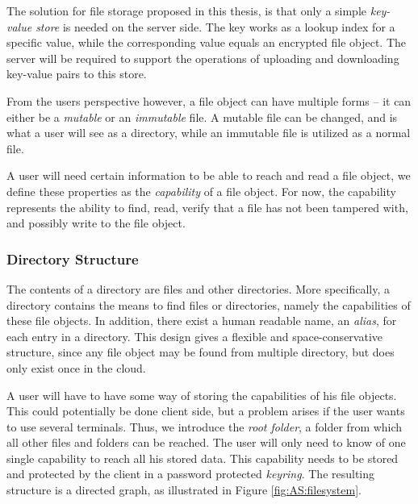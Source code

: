 \documentclass[pdftex,english,10pt,b5paper,twoside]{book}
\begin{document}
The solution for file storage proposed in this thesis, is that only a simple
\emph{key-value store} is needed on the server side. The key works as a lookup
index for a specific value, while the corresponding value equals an encrypted
file object. The server will be required to support the operations of uploading
and downloading key-value pairs to this store.

From the users perspective however, a file object can have multiple forms -- it
can either be a \emph{mutable} or an \emph{immutable} file. A mutable file can
be changed, and is what a user will see as a directory, while an immutable file
is utilized as a normal file.

A user will need certain information to be able to reach and read a file
object, we define these properties as the \emph{capability} of a file object.
For now, the capability represents the ability to find, read, verify that a
file has not been tampered with, and possibly write to the file object.

\subsubsection{Directory Structure}

The contents of a directory are files and other directories. More specifically,
a directory contains the means to find files or directories, namely the
capabilities of these file objects. In addition, there exist a human readable
name, an \emph{alias}, for each entry in a directory. This design gives a
flexible and space-conservative structure, since any file object may be found
from multiple directory, but does only exist once in the cloud.

A user will have to have some way of storing the capabilities of his file
objects. This could potentially be done client side, but a problem arises if
the user wants to use several terminals. Thus, we introduce the \emph{root
folder}, a folder from which all other files and folders can be reached. The
user will only need to know of one single capability to reach all his stored
data. This capability needs to be stored and protected by the client in a
password protected \emph{keyring}. The resulting structure is a
directed graph, as illustrated in Figure \ref{fig:AS:filesystem}.
\end{document}

